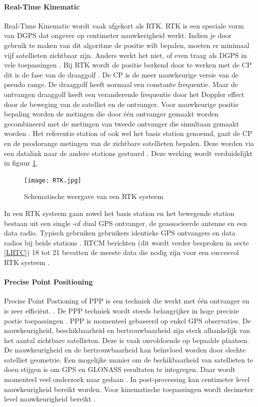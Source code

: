 \paragraph{Real-Time Kinematic}
Real-Time Kinematic wordt vaak afgekort als RTK. RTK is een speciale vorm van DGPS dat ongever op centimeter nauwkerigheid werkt. Indien je door gebruik te maken van dit algoritme de positie wilt bepalen, moeten er minimaal vijf satellieten zichtbaar zijn. Anders werkt het niet, of even traag als DGPS in vele toepassingen \cite{LBibRTK}. Bij RTK wordt de positie berkend door te werken met de CP dit is de fase van de draaggolf \cite{LBibRTK2}. De CP is de meer nauwkeurige versie van de pseudo range. De draaggolf heeft normaal een constante frequentie. Maar de ontvangen draaggolf heeft een veranderende frequentie door het Doppler effect door de beweging van de satelliet en de ontvanger. Voor nauwkeurige positie bepaling worden de metingen die door \'e\'en ontvanger gemaakt worden gecombineerd met de metingen van tweede ontvanger die simultaan gemaakt worden \cite{LBibRTK3}. Het referentie station of ook wel het basis station genoemd, gaat de CP en de peodorange metingen van de zichtbare satellieten bepalen. Deze worden via een datalink naar de andere stations gestuurd \cite{LBibDGPS}. Deze werking wordt verduidelijkt in figuur \ref{imgRTK}. 

\begin{figure}[hpb]
	\texttt{[image: RTK.jpg]}
	\caption{Schematische weergave van een RTK systeem \cite{LBibDGPS}}
	\label{imgRTK}
\end{figure}

In een RTK systeem gaan zowel het basis station en het bewegende station bestaan uit een single -of dual GPS ontvanger, de geassocieerde antenne en een data radio. Typisch gebruiken gebruikers identieke GPS ontvangers en data radios bij beide stations \cite{LBibRTK3}. RTCM berichten (dit wordt verder besproken in secte \ref{LRTC}) 18 tot 21 bevatten de meeste data die nodig zijn voor een succesvol RTK systeem \cite{LBibDGPS} .


\paragraph{Precise Point Positioning}
Precise Point Postioning of PPP is een techniek die werkt met \'e\'en ontvanger en is zeer effici\"ent. \cite{LBibGNSS4}. De PPP techniek wordt steeds belangrijker in hoge precisie postie toepassingen \cite{LBibPPP2}. PPP is momenteel gebaseerd op enkel GPS observaties. De nauwkeurigheid, beschikbaarheid en bertrouwbaarheid zijn sterk afhankelijk van het aantal zichtbare satellieten. Deze is vaak onvoldoende op bepaalde plaatsen. De nauwkeurigheid en de bertrouwbaarheid kan be\"invloed worden door slechte satelliet geometrie. Een mogelijke manier om de bschikbaarheid van satellieten te doen stijgen is om GPS en GLONASS resultaten te integregen. Daar wordt momenteel veel onderzoek naar gedaan \cite{LBibPPP}. In post-processing kan centimeter level nauwkeurigheid bereikt worden. Voor kinematische toepassingen wordt decimeter level nauwkeurigheid bereikt \cite{LBibGPS2}.  

